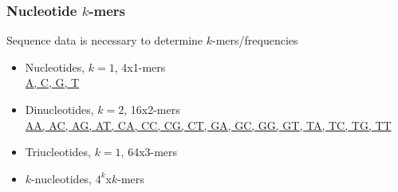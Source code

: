 \begin{frame}
  \frametitle{Nucleotide $k$-mers}
  Sequence data is necessary to determine $k$-mers/frequencies
  \begin{itemize}
    \item \textcolor{hutton_green}{Nucleotides, $k=1$, 4x1-mers} \\
      \url{A, C, G, T}
    \item \textcolor{hutton_blue}{Dinucleotides, $k=2$, 16x2-mers} \\
      \url{AA, AC, AG, AT, CA, CC, CG, CT, GA, GC, GG, GT, TA, TC, TG, TT}
    \item \textcolor{RawSienna}{Triucleotides, $k=1$, 64x3-mers}
    \item \textcolor{hutton_purple}{$k$-nucleotides, $4^k$x$k$-mers}
  \end{itemize}  
\end{frame}